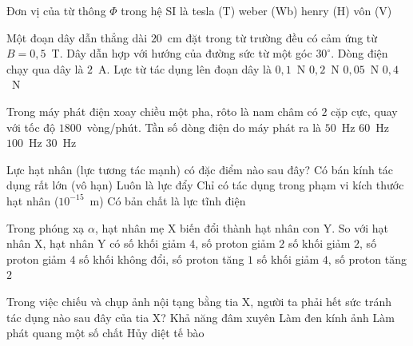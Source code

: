 	\begin{ex}%
		Đơn vị của từ thông $\Phi$ trong hệ SI là
		\choice
		{tesla (T)}
		{\True weber (Wb)}
		{henry (H)}
		{vôn (V)}
	\end{ex}

	\begin{ex}%
		Một đoạn dây dẫn thẳng dài $20$~cm đặt trong từ trường đều có cảm ứng từ $B=0{,}5$~T. Dây dẫn hợp với hướng của đường sức từ một góc $30^\circ$. Dòng điện chạy qua dây là $2$~A. Lực từ tác dụng lên đoạn dây là
		\choice
		{\True $0{,}1$~N}
		{$0{,}2$~N}
		{$0{,}05$~N}
		{$0{,}4$~N}
	\end{ex}

	\begin{ex}%
		Trong máy phát điện xoay chiều một pha, rôto là nam châm có $2$ cặp cực, quay với tốc độ $1800$~vòng/phút. Tần số dòng điện do máy phát ra là
		\choice
		{$50$~Hz}
		{\True $60$~Hz}
		{$100$~Hz}
		{$30$~Hz}
	\end{ex}

	\begin{ex}%
		Lực hạt nhân (lực tương tác mạnh) có đặc điểm nào sau đây?
		\choice
		{Có bán kính tác dụng rất lớn (vô hạn)}
		{Luôn là lực đẩy}
		{\True Chỉ có tác dụng trong phạm vi kích thước hạt nhân ($10^{-15}$~m)}
		{Có bản chất là lực tĩnh điện}
	\end{ex}

	\begin{ex}%
		Trong phóng xạ $\alpha$, hạt nhân mẹ X biến đổi thành hạt nhân con Y. So với hạt nhân X, hạt nhân Y có
		\choice
		{\True số khối giảm $4$, số proton giảm $2$}
		{số khối giảm $2$, số proton giảm $4$}
		{số khối không đổi, số proton tăng $1$}
		{số khối giảm $4$, số proton tăng $2$}
	\end{ex}

	\begin{ex}%
		Trong việc chiếu và chụp ảnh nội tạng bằng tia X, người ta phải hết sức tránh tác dụng nào sau đây của tia X?
		\choice
		{Khả năng đâm xuyên}
		{Làm đen kính ảnh}
		{Làm phát quang một số chất}
		{\True Hủy diệt tế bào}
	\end{ex}

